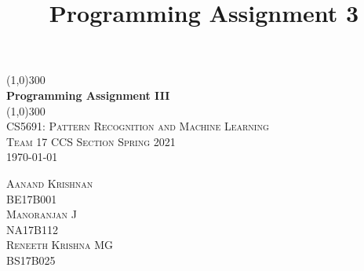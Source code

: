 \documentclass{article}
\title{Programming Assignment 3}
\begin{document}
\begin{titlepage}
	\begin{center}
    \line(1,0){300}\\
    [0.65cm]
	\huge{\bfseries Programming Assignment III}\\
	\line(1,0){300}\\
	\textsc{\Large CS5691: Pattern Recognition and Machine Learning}\\
	\textsc{\large{Team 17 CCS Section Spring 2021}}\\
	\textsc{ \small{\today}}\\
	[5.5cm]     
	\end{center}
	\begin{flushright}
		\textsc{\Large Aanand Krishnan\\\small{BE17B001}}\\
		[0.5cm]
		\textsc{\Large Manoranjan J\\ \small{NA17B112}}\\
		[0.5cm]
		\textsc{\Large Reneeth Krishna MG\\\small{BS17B025}}
	\end{flushright}
\end{titlepage}
\tableofcontents
\newpage




\newpage



\newpage


\end{document}
